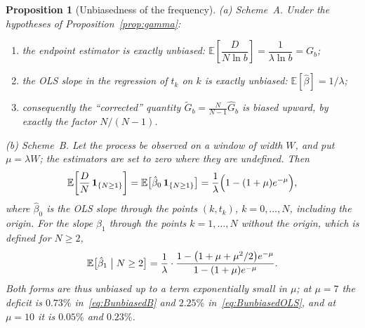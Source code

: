 \documentclass[11pt,a4paper]{article}
\theoremstyle{plain}
\newtheorem{proposition}{Proposition}
\theoremstyle{remark}
\begin{document}
\begin{proposition}[Unbiasedness of the frequency]\label{prop:unbiased}
\emph{(a) Scheme~A.} Under the hypotheses of Proposition~\ref{prop:gamma}:
\begin{enumerate}
\item[\rm(i)] the endpoint estimator is exactly unbiased:
$\mathbb E\!\left[\dfrac{D}{N\ln b}\right]=\dfrac{1}{\lambda\ln b}=G_b$;
\item[\rm(ii)] the OLS slope in the regression of $t_k$ on $k$ is exactly
unbiased: $\mathbb E[\hat\beta]=1/\lambda$;
\item[\rm(iii)] consequently the ``corrected'' quantity
$\tilde G_b=\frac{N}{N-1}\hat G_b$ is biased \emph{upward}, by exactly the
factor $N/(N-1)$.
\end{enumerate}
\emph{(b) Scheme~B.} Let the process be observed on a window of width $W$, and
put $\mu=\lambda W$; the estimators are set to zero where they are undefined.
Then
\begin{equation}\label{eq:BunbiasedB}
\mathbb E\!\left[\frac{D}{N}\,\mathbf 1_{\{N\ge1\}}\right]
=\mathbb E\bigl[\hat\beta_0\,\mathbf 1_{\{N\ge1\}}\bigr]
=\frac{1}{\lambda}\Bigl(1-(1+\mu)e^{-\mu}\Bigr),
\end{equation}
where $\hat\beta_0$ is the OLS slope through the points $(k,t_k)$,
$k=0,\dots,N$, \emph{including} the origin. For the slope $\hat\beta_1$ through
the points $k=1,\dots,N$ \emph{without} the origin, which is defined for
$N\ge2$,
\begin{equation}\label{eq:BunbiasedOLS}
\mathbb E\bigl[\hat\beta_1\bigm|N\ge2\bigr]
=\frac{1}{\lambda}\cdot
\frac{1-\bigl(1+\mu+\mu^2/2\bigr)e^{-\mu}}{1-(1+\mu)e^{-\mu}} .
\end{equation}
Both forms are thus unbiased up to a term exponentially small in $\mu$; at
$\mu=7$ the deficit is $0.73\%$ in~\eqref{eq:BunbiasedB} and $2.25\%$
in~\eqref{eq:BunbiasedOLS}, and at $\mu=10$ it is $0.05\%$ and $0.23\%$.
\end{proposition}
\end{document}
